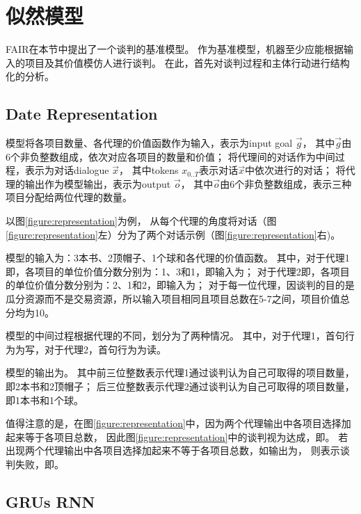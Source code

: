\section{似然模型}

\label{section:likelihood}

FAIR在本节中提出了一个谈判的基准模型。
作为基准模型，机器至少应能根据输入的项目及其价值模仿人进行谈判。
在此，首先对谈判过程和主体行动进行结构化的分析。


\subsection{Date Representation}
\label{subsection:date_representation}

模型将各项目数量、各代理的价值函数作为输入，表示为input goal $\vec{g}$，
其中$\vec{g}$由6个非负整数组成，依次对应各项目的数量和价值；
将代理间的对话作为中间过程，表示为对话dialogue $\vec{x}$，
其中tokens $x_{0..T}$表示对话$\vec{x}$中依次进行的对话；
将代理的输出作为模型输出，表示为output $\vec{o}$，
其中$\vec{o}$由6个非负整数组成，表示三种项目分配给两位代理的数量。

以图\ref{figure:representation}为例，
从每个代理的角度将对话（图\ref{figure:representation}左）分为了两个对话示例（图\ref{figure:representation}右)。

模型的输入为：3本书、2顶帽子、1个球和各代理的价值函数。
其中，对于代理1即，各项目的单位价值分数分别为：1、3和1，即输入为；
对于代理2即，各项目的单位价值分数分别为：2、1和2，即输入为；
对于每一位代理，因谈判的目的是瓜分资源而不是交易资源，所以输入项目相同且项目总数在5-7之间，项目价值总分均为10。

模型的中间过程根据代理的不同，划分为了两种情况。
其中，对于代理1，首句行为为写，对于代理2，首句行为为读。

模型的输出为。
其中前三位整数表示代理1通过谈判认为自己可取得的项目数量，即2本书和2顶帽子；
后三位整数表示代理2通过谈判认为自己可取得的项目数量，即1本书和1个球。

值得注意的是，在图\ref{figure:representation}中，因为两个代理输出中各项目选择加起来等于各项目总数，
因此图\ref{figure:representation}中的谈判视为达成，即。
若出现两个代理输出中各项目选择加起来不等于各项目总数，如输出为，
则表示谈判失败，即。

\subsection{GRUs RNN}
\label{subsection:grus_rnn}

